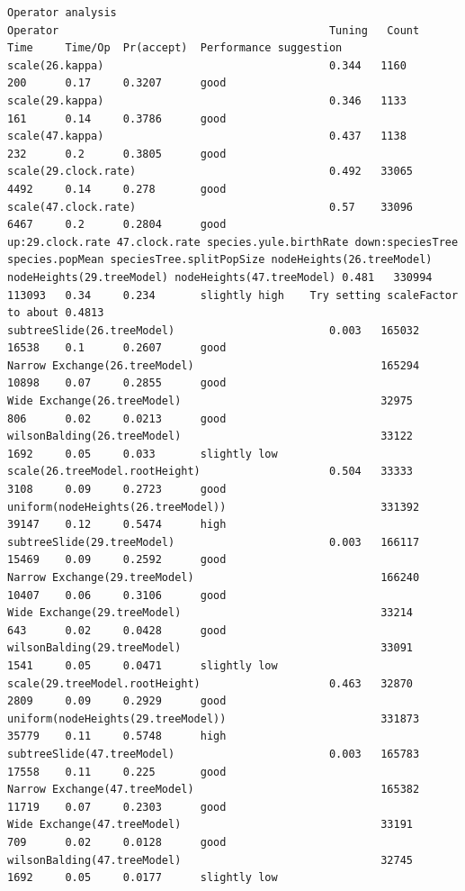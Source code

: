 \documentclass[12pt]{article}
\begin{document}
{\begin{verbatim}
Operator analysis
Operator                                          Tuning   Count      Time     Time/Op  Pr(accept)  Performance suggestion
scale(26.kappa)                                   0.344   1160       200      0.17     0.3207      good	
scale(29.kappa)                                   0.346   1133       161      0.14     0.3786      good	
scale(47.kappa)                                   0.437   1138       232      0.2      0.3805      good	
scale(29.clock.rate)                              0.492   33065      4492     0.14     0.278       good	
scale(47.clock.rate)                              0.57    33096      6467     0.2      0.2804      good	
up:29.clock.rate 47.clock.rate species.yule.birthRate down:speciesTree species.popMean speciesTree.splitPopSize nodeHeights(26.treeModel) nodeHeights(29.treeModel) nodeHeights(47.treeModel) 0.481   330994     113093   0.34     0.234       slightly high	Try setting scaleFactor to about 0.4813
subtreeSlide(26.treeModel)                        0.003   165032     16538    0.1      0.2607      good	
Narrow Exchange(26.treeModel)                             165294     10898    0.07     0.2855      good	
Wide Exchange(26.treeModel)                               32975      806      0.02     0.0213      good	
wilsonBalding(26.treeModel)                               33122      1692     0.05     0.033       slightly low	
scale(26.treeModel.rootHeight)                    0.504   33333      3108     0.09     0.2723      good	
uniform(nodeHeights(26.treeModel))                        331392     39147    0.12     0.5474      high	
subtreeSlide(29.treeModel)                        0.003   166117     15469    0.09     0.2592      good	
Narrow Exchange(29.treeModel)                             166240     10407    0.06     0.3106      good	
Wide Exchange(29.treeModel)                               33214      643      0.02     0.0428      good	
wilsonBalding(29.treeModel)                               33091      1541     0.05     0.0471      slightly low	
scale(29.treeModel.rootHeight)                    0.463   32870      2809     0.09     0.2929      good	
uniform(nodeHeights(29.treeModel))                        331873     35779    0.11     0.5748      high	
subtreeSlide(47.treeModel)                        0.003   165783     17558    0.11     0.225       good	
Narrow Exchange(47.treeModel)                             165382     11719    0.07     0.2303      good	
Wide Exchange(47.treeModel)                               33191      709      0.02     0.0128      good	
wilsonBalding(47.treeModel)                               32745      1692     0.05     0.0177      slightly low	

\end{verbatim}}
\end{document}
